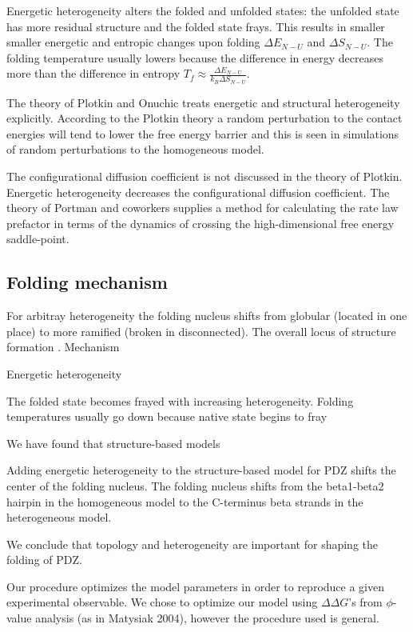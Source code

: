 \documentclass[preprint]{elsarticle}
\begin{document}
    Energetic heterogeneity alters the folded and unfolded states: the unfolded
state has more residual structure and the folded state frays. This results in
smaller smaller energetic and entropic changes upon folding $\Delta E_{N-U}$
and $\Delta S_{N-U}$. The folding temperature usually lowers because the
difference in energy decreases more than the difference in entropy $T_f \approx
\frac{\Delta E_{N-U}}{k_B \Delta S_{N-U}}$. 

    The theory of Plotkin and Onuchic \cite{Plotkin2002a} treats energetic and
structural heterogeneity explicitly. According to the Plotkin theory a random
perturbation to the contact energies will tend to lower the free energy barrier
and this is seen in simulations of random perturbations to the homogeneous
model. 


    The configurational diffusion coefficient is not discussed in the theory of
Plotkin. Energetic heterogeneity decreases the configurational diffusion
coefficient. The theory of Portman and coworkers \cite{Portman2001a} supplies a
method for calculating the rate law prefactor in terms of the dynamics of
crossing the high-dimensional free energy saddle-point.


\subsection{Folding mechanism}

    For arbitray heterogeneity the folding nucleus shifts from globular
(located in one place) to more ramified (broken in disconnected). The overall 
locus of structure formation .
    Mechanism

 Energetic heterogeneity

 The folded state becomes frayed with increasing heterogeneity. 
    Folding temperatures usually go down because native state begins to fray

We have found that structure-based models

Adding energetic heterogeneity to the structure-based model for PDZ shifts the
center of the folding nucleus. The folding nucleus shifts from the beta1-beta2
hairpin in the homogeneous model to the C-terminus beta strands in the
heterogeneous model. 

We conclude that topology and heterogeneity are important for shaping the
folding of PDZ.


    Our procedure optimizes the model parameters in order to reproduce a given
experimental observable. We chose to optimize our model using  $\Delta\Delta
G$'s from $\phi$-value analysis (as in Matysiak 2004), however the procedure
used is general.
\end{document}
